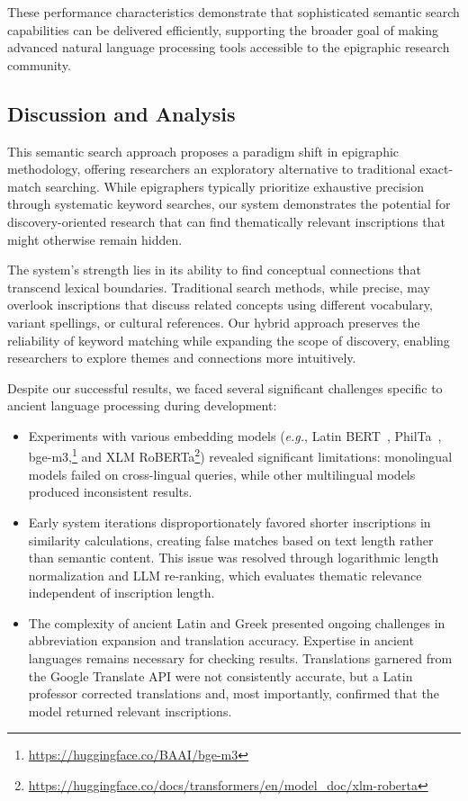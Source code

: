 \documentclass[final,greek,american]{anthology-ch}
\newcommand{\eg}{\textit{e.g.},\xspace}
\begin{document}
These performance characteristics demonstrate that sophisticated semantic search capabilities can be delivered efficiently, supporting the broader goal of making advanced natural language processing tools accessible to the epigraphic research community.

\subsection{Discussion and Analysis}

This semantic search approach proposes a paradigm shift in epigraphic methodology, offering researchers an exploratory alternative to traditional exact-match searching. While epigraphers typically prioritize exhaustive precision through systematic keyword searches, our system demonstrates the potential for discovery-oriented research that can find thematically relevant inscriptions that might otherwise remain hidden.

The system's strength lies in its ability to find conceptual connections that transcend lexical boundaries. Traditional search methods, while precise, may overlook inscriptions that discuss related concepts using different vocabulary, variant spellings, or cultural references. Our hybrid approach preserves the reliability of keyword matching while expanding the scope of discovery, enabling researchers to explore themes and connections more intuitively.

Despite our successful results, we faced several significant challenges specific to ancient language processing during development:
\begin{itemize}

\item Experiments with various embedding models (\eg Latin BERT~\cite{bamman_latin_2020}, PhilTa~\cite{riemenschneider_exploring_2023}, bge-m3,\footnote{\url{https://huggingface.co/BAAI/bge-m3}} and XLM RoBERTa\footnote{\url{https://huggingface.co/docs/transformers/en/model_doc/xlm-roberta}}) revealed significant limitations: monolingual models failed on cross-lingual queries, while other multilingual models produced inconsistent results.

\item Early system iterations disproportionately favored shorter inscriptions in similarity calculations, creating false matches based on text length rather than semantic content. This issue was resolved through logarithmic length normalization and LLM re-ranking, which evaluates thematic relevance independent of inscription length.

\item The complexity of ancient Latin and Greek presented ongoing challenges in abbreviation expansion and translation accuracy. Expertise in ancient languages remains necessary for checking results. Translations garnered from the Google Translate API were not consistently accurate, but a Latin professor corrected translations and, most importantly, confirmed that the model returned relevant inscriptions.
\end{itemize}
\end{document}
